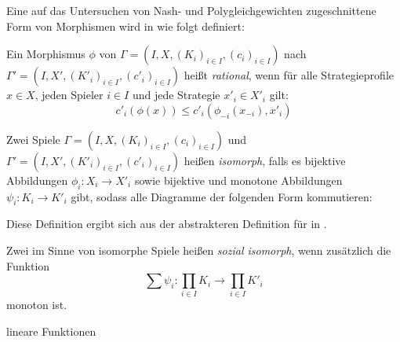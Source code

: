 Eine auf das Untersuchen von Nash- und Polygleichgewichten zugeschnittene Form von Morphismen wird in \cite{Polyequilibrium} wie folgt definiert:

\begin{defn}
	Ein Morphismus $\phi$ von $\Gamma = (I, X, (K_i)_{i\in I}, (c_i)_{i\in I})$ nach $\Gamma' = (I, X', (K'_i)_{i\in I}, (c'_i)_{i\in I})$ heißt \emph{rational}, wenn für alle Strategieprofile $x \in X$, jeden Spieler $i \in I$ und jede Strategie $x'_i \in X'_i$ gilt:
	\[c'_i(\phi(x)) \leq c'_i(\phi_{-i}(x_{-i}), x'_i) \]
\end{defn}


\begin{defn}\label{def:SpielIsomLap}
	Zwei Spiele $\Gamma = (I, X, (K_i)_{i\in I}, (c_i)_{i\in I})$ und $\Gamma' = (I, X', (K'_i)_{i\in I}, (c'_i)_{i\in I})$ heißen \emph{isomorph}, falls es bijektive Abbildungen $\phi_i: X_i \to X'_i$ sowie bijektive und monotone Abbildungen $\psi_i: K_i \to K'_i$ gibt, sodass alle Diagramme der folgenden Form kommutieren:
	
	\begin{center}
	\end{center}
\end{defn}

\begin{bem}\label{bem:LapMorDef}
	Diese Definition ergibt sich aus der abstrakteren Definition für  in \cite{LapGameCat}. 
	
\end{bem}

\begin{defn}
	Zwei im Sinne von  isomorphe Spiele heißen \emph{sozial isomorph}, wenn zusätzlich die Funktion
		\[\sum \psi_i: \prod_{i \in I}K_i \to \prod_{i \in I} K'_i \]
	monoton ist. 
\end{defn}

\begin{bsp}
	lineare Funktionen
\end{bsp}	


